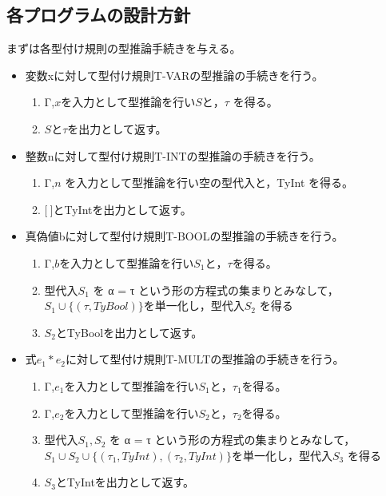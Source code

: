 \documentclass[a4paper,11pt,oneside,openany]{jsarticle}
\begin{document}
\subsection{各プログラムの設計方針}
  まずは各型付け規則の型推論手続きを与える。
  \begin{itemize}
    \item 変数xに対して型付け規則T-VARの型推論の手続きを行う。
    \begin{enumerate}
      \item Γ,$x を入力として型推論を行いSと，τ$ を得る。
      \item $Sとτ$を出力として返す。
    \end{enumerate}
  \end{itemize}
  \begin{itemize}
    \item 整数nに対して型付け規則T-INTの型推論の手続きを行う。
    \begin{enumerate}
      \item Γ,$n$ を入力として型推論を行い空の型代入と，TyInt を得る。
      \item $\bigl[\ \bigr]$とTyIntを出力として返す。
    \end{enumerate}
  \end{itemize}
  \begin{itemize}
    \item 真偽値bに対して型付け規則T-BOOLの型推論の手続きを行う。
    \begin{enumerate}
      \item Γ,$b を入力として型推論を行いS_1と，τ$を得る。
      \item 型代入$S_1$ を α = τ という形の方程式の集まりとみなして，$S_1∪\{(τ,TyBool)\} を単一化し，型代入S_2$ を得る
      \item $S_2$とTyBoolを出力として返す。
    \end{enumerate}
  \end{itemize}
  \begin{itemize}
    \item 式$e_1*e_2$に対して型付け規則T-MULTの型推論の手続きを行う。
    \begin{enumerate}
      \item Γ,$e_1 を入力として型推論を行いS_1と，τ_1$を得る。
      \item Γ,$e_2 を入力として型推論を行いS_2と，τ_2$を得る。
      \item 型代入$S_1,S_2$ を α = τ という形の方程式の集まりとみなして，$S_1∪S_2∪\{(τ_1,TyInt),(τ_2,TyInt)\} を単一化し，型代入S_3$ を得る
      \item $S_3$とTyIntを出力として返す。
    \end{enumerate}
  \end{itemize}
\end{document}
